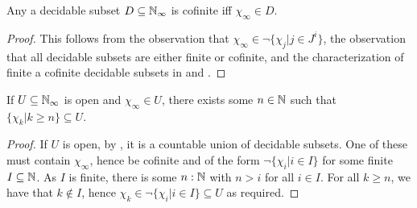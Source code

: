 \begin{corollary}
 Any a decidable subset $D\subseteq\mathbb{N}_{\infty}$ is cofinite iff $\chi_\infty\in D$. 
\end{corollary}
\begin{proof}
  This follows from the observation that $\chi_\infty \in \neg \{\chi_j | j \in J^i\}$, 
  the observation that all decidable subsets are either finite or cofinite, 
  and the characterization of finite a cofinite decidable subsets in 
   and 
  .
\end{proof}
\begin{corollary}
  If $U\subseteq \mathbb{N}_{\infty}$ is open and $\chi_\infty \in U$, there exists some $n\in \mathbb{N}$ such that 
  $\{\chi_k | k\geq n\} \subseteq U$. 
\end{corollary}
\begin{proof}
  If $U$ is open, by , it is a countable union of decidable subsets. 
  One of these must contain $\chi_\infty$, hence be cofinite and 
  of the form $\neg \{ \chi_i | i \in I\}$ for some finite $I\subseteq \mathbb{N}$.
  As $I$ is finite, there is some $n:\mathbb{N} $ with $n>i$ for all $i\in I$. 
  For all $k\geq n$, we have that $k\notin I$, hence $\chi_k \in \neg \{\chi_i | i \in I\}\subseteq U$ as required. 
\end{proof}



%
%


